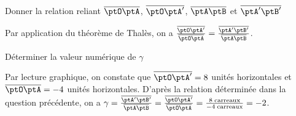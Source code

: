 
\begin{enonce}
Donner la relation reliant $\overline{\ptO\ptA}$, $\overline{\ptO\ptA'}$, $\overline{\ptA\ptB}$ et $\overline{\ptA'\ptB'}$
\end{enonce}


\begin{corrige}
Par application du théorème de Thalès, on a $\frac{\overline{\ptO\ptA'}}{\overline{\ptO\ptA}}=\frac{\overline{\ptA'\ptB'}}{\overline{\ptA\ptB}}$.
\end{corrige}




\begin{enonce}
Déterminer la valeur numérique de $\gamma$
\end{enonce}


\begin{corrige}
Par lecture graphique, on constate que $\overline{\ptO\ptA'}=8$ unités horizontales et $\overline{\ptO\ptA}=-4$ unités horizontales. D'après la relation déterminée dans la question précédente, on a $\gamma = \frac{\overline{\ptA'\ptB'}}{\overline{\ptA\ptB}}= \frac{\overline{\ptO\ptA'}}{\overline{\ptO\ptA}}=\frac{8 \; \mathrm{carreaux}}{-4 \; \mathrm{carreaux}}=-2$.
\end{corrige}


\finEntrainement











